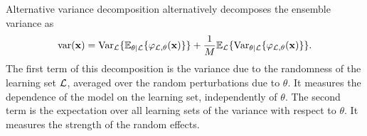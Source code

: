 \begin{remark}{Alternative variance decomposition}
\citet{geurts:2002} alternatively decomposes the ensemble variance as
\begin{equation}\label{eqn:4:variance-geurts}
\text{var}(\mathbf{x}) = \text{Var}_{\cal L} \{ \mathbb{E}_{\theta|{\cal L}} \{ \varphi_{{\cal L},\theta}(\mathbf{x}) \} \} + \frac{1}{M} \mathbb{E}_{\cal L} \{ \text{Var}_{\theta|{\cal L}} \{ \varphi_{{\cal L},\theta}(\mathbf{x}) \} \}.
\end{equation}
The first term of this decomposition is the variance due to the randomness
of the learning set ${\cal L}$, averaged over the random perturbations due to $\theta$. It
measures the dependence of the model on the learning set, independently of
$\theta$. The second term is the expectation over all learning sets of
the variance with respect to $\theta$. It measures the strength of the
random effects.


\end{remark}

